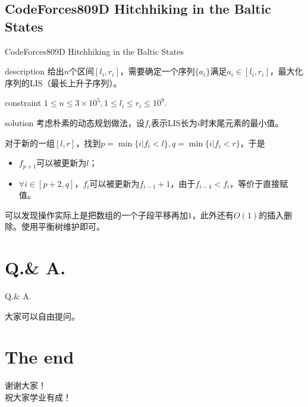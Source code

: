 \documentclass{beamer}
\begin{document}
\subsection{CodeForces809D Hitchhiking in the Baltic States}
\begin{frame}{CodeForces809D Hitchhiking in the Baltic States}
\begin{block}{description}
给出$n$个区间$[l_i,r_i]$，需要确定一个序列$\{a_i\}$满足$a_i \in [l_i,r_i]$，最大化序列的LIS（最长上升子序列）。
\end{block}
\begin{block}{constraint}
$1 \le n \le 3\times 10^5, 1 \le l_i \le r_i \le 10^9.$
\end{block}
\pause
\begin{block}{solution}
考虑朴素的动态规划做法，设$f_i$表示LIS长为$i$时末尾元素的最小值。

对于新的一组$[l,r]$，找到$p=\min\{i|f_i<l\},q=\min\{i|f_i<r\}$，于是

\begin{itemize}
	\item $f_{p+1}$可以被更新为$l$；
	\item $\forall i \in[p+2,q]$，$f_i$可以被更新为$f_{i-1}+1$，由于$f_{i-1} < f_i$，等价于直接赋值。
\end{itemize}

可以发现操作实际上是把数组的一个子段平移再加$1$，此外还有$O(1)$的插入删除。使用平衡树维护即可。
\end{block}
\end{frame}


	\section{Q.\& A.}
	\begin{frame}{Q.\& A.}
	\begin{center}
		{\large 大家可以自由提问。}
	\end{center}
	\end{frame}
	\section{The end}
	\begin{frame}
		\begin{center}
			{\huge 谢谢大家！\\  \large 祝大家学业有成！}
		\end{center}
	\end{frame}
\end{document}
